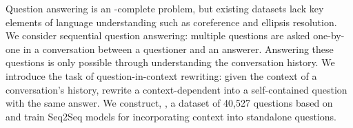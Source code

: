 Question answering is an -complete problem, but existing datasets
lack key elements of language understanding such as coreference and
ellipsis resolution.
We consider sequential question answering: multiple questions are
asked one-by-one in a conversation between a questioner
and an answerer. 
Answering these questions is only possible through understanding the
conversation history.
We introduce the task of question-in-context
rewriting: given the context of a conversation's history, rewrite a
context-dependent into a self-contained
question with the same answer.
We construct, \name{}, a dataset of 40,527 questions based on
\quac~\cite{ChoiQuAC2018} and train Seq2Seq models for incorporating context into standalone questions.



